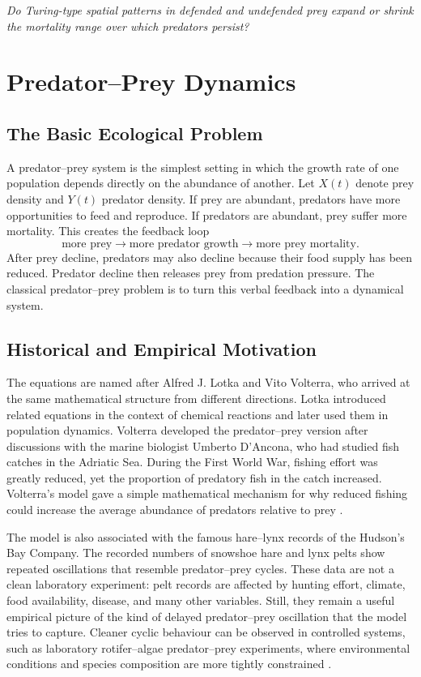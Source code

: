 \documentclass[12pt,letterpaper]{article}
\numberwithin{equation}{section}
\begin{document}
\begin{center}
\emph{Do Turing-type spatial patterns in defended and undefended prey expand or shrink
the mortality range over which predators persist?}
\end{center}

\section{Predator--Prey Dynamics}

\subsection{The Basic Ecological Problem}

A predator--prey system is the simplest setting in which the growth rate of one
population depends directly on the abundance of another. Let $X(t)$ denote prey
density and $Y(t)$ predator density. If prey are abundant, predators have more
opportunities to feed and reproduce. If predators are abundant, prey suffer more
mortality. This creates the feedback loop
\[
    \text{more prey} \longrightarrow \text{more predator growth}
    \longrightarrow \text{more prey mortality}.
\]
After prey decline, predators may also decline because their food supply has been
reduced. Predator decline then releases prey from predation pressure. The classical
predator--prey problem is to turn this verbal feedback into a dynamical system.

\subsection{Historical and Empirical Motivation}

The equations are named after Alfred J. Lotka and Vito Volterra, who arrived at the
same mathematical structure from different directions. Lotka introduced related
equations in the context of chemical reactions and later used them in population
dynamics. Volterra developed the predator--prey version after discussions with the
marine biologist Umberto D'Ancona, who had studied fish catches in the Adriatic Sea.
During the First World War, fishing effort was greatly reduced, yet the proportion of
predatory fish in the catch increased. Volterra's model gave a simple mathematical
mechanism for why reduced fishing could increase the average abundance of predators
relative to prey \cite{murray2002,kot2001}.

The model is also associated with the famous hare--lynx records of the Hudson's Bay
Company. The recorded numbers of snowshoe hare and lynx pelts show repeated
oscillations that resemble predator--prey cycles. These data are not a clean laboratory
experiment: pelt records are affected by hunting effort, climate, food availability,
disease, and many other variables. Still, they remain a useful empirical picture of the
kind of delayed predator--prey oscillation that the model tries to capture. Cleaner
cyclic behaviour can be observed in controlled systems, such as laboratory
rotifer--algae predator--prey experiments, where environmental conditions and species
composition are more tightly constrained \cite{kot2001,edelstein2005}.
\end{document}
